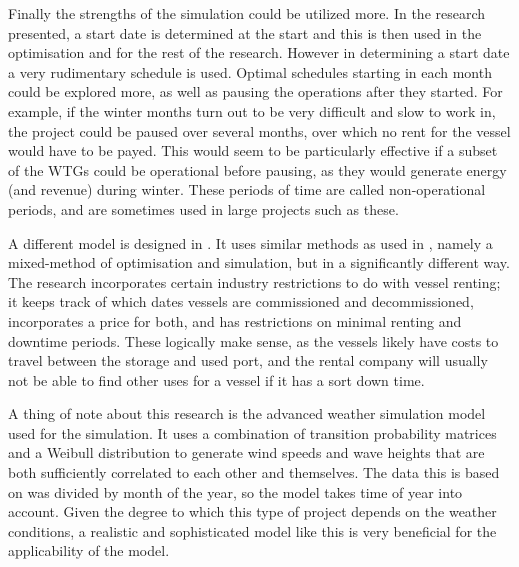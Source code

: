 \documentclass[a4paper,12pt]{article}
\begin{document}
Finally the strengths of the simulation could be utilized more. In the research presented, a start date is determined at the start and this is then used in the optimisation and for the rest of the research. However in determining a start date a very rudimentary schedule is used. Optimal schedules starting in each month could be explored more, as well as pausing the operations after they started. For example, if the winter months turn out to be very difficult and slow to work in, the project could be paused over several months, over which no rent for the vessel would have to be payed. This would seem to be particularly effective if a subset of the WTGs could be operational before pausing, as they would generate energy (and revenue) during winter. These periods of time are called non-operational periods, and are sometimes used in large projects such as these.  

\bigskip

A different model is designed in \cite{kerkhove2017optimised}. It uses similar methods as used in \cite{barlow2018mixed}, namely a mixed-method of optimisation and simulation, but in a significantly different way. The research incorporates certain industry restrictions to do with vessel renting; it keeps track of which dates vessels are commissioned and decommissioned, incorporates a price for both, and has restrictions on minimal renting and downtime periods. These logically make sense, as the vessels likely have costs to travel between the storage and used port, and the rental company will usually not be able to find other uses for a vessel if it has a sort down time. 

A thing of note about this research is the advanced weather simulation model used for the simulation. It uses a combination of transition probability matrices and a Weibull distribution to generate wind speeds and wave heights that are both sufficiently correlated to each other and themselves. The data this is based on was divided by month of the year, so the model takes time of year into account. Given the degree to which this type of project depends on the weather conditions, a realistic and sophisticated model like this is very beneficial for the applicability of the model. 
\end{document}
